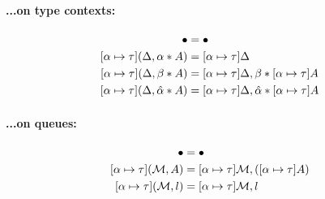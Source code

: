 \documentclass{article}
\newcommand{\mypar}[1]{\vspace{0.2cm}\paragraph{#1:} \hfill\vspace{0.1cm}}
\begin{document}
\noindent
\begin{minipage}[t]{0.47\textwidth}
  \mypar{{...on type contexts}}
  \begin{align*}
    [\substitution{\alpha}{\tau}]\bullet &= \bullet\\
    [\substitution{\alpha}{\tau}](\Delta,\tentry{\alpha}{A}) &= [\substitution{\alpha}{\tau}]\Delta\\
    [\substitution{\alpha}{\tau}](\Delta,\tentry{\beta}{A}) &= [\substitution{\alpha}{\tau}]\Delta,\tentry{\beta}{[\substitution{\alpha}{\tau}]A}\\
    [\substitution{\alpha}{\tau}](\Delta,\tentry{\hat\alpha}{A}) &= [\substitution{\alpha}{\tau}]\Delta,\tentry{\hat\alpha}{[\substitution{\alpha}{\tau}]A}
  \end{align*}
\end{minipage}
\begin{minipage}[t]{0.47\textwidth}
    \mypar{{...on queues}}
  \begin{align*}
    [\substitution{\alpha}{\tau}]\bullet &= \bullet\\
    [\substitution{\alpha}{\tau}](\mathcal{M},A) &= [\substitution{\alpha}{\tau}]\mathcal{M},([\substitution{\alpha}{\tau}]A)\\
    [\substitution{\alpha}{\tau}](\mathcal{M},l) &= [\substitution{\alpha}{\tau}]\mathcal{M},l
  \end{align*}
\end{minipage}\\%
\end{document}

